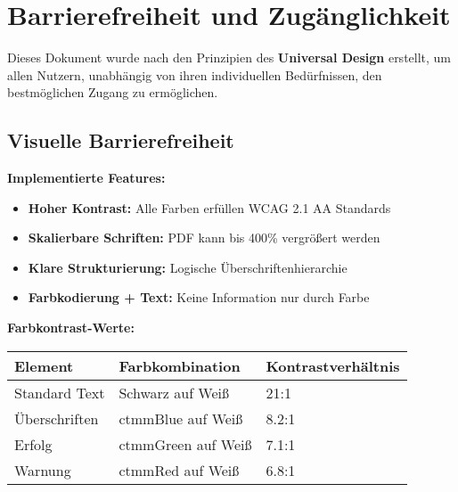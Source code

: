 
\section{Barrierefreiheit und Zugänglichkeit}
\label{sec:accessibility}

\begin{ctmmBlueBox}[title=CTMM Barrierefreiheits-Standards]

Dieses Dokument wurde nach den Prinzipien des \textbf{Universal Design} erstellt, um allen Nutzern, unabhängig von ihren individuellen Bedürfnissen, den bestmöglichen Zugang zu ermöglichen.

\end{ctmmBlueBox}

\subsection{Visuelle Barrierefreiheit}

\begin{ctmmGreenBox}[title=Sehfreundliche Gestaltung]

\textbf{Implementierte Features:}
\begin{itemize}
    \item \textbf{Hoher Kontrast:} Alle Farben erfüllen WCAG 2.1 AA Standards
    \item \textbf{Skalierbare Schriften:} PDF kann bis 400\% vergrößert werden
    \item \textbf{Klare Strukturierung:} Logische Überschriftenhierarchie
    \item \textbf{Farbkodierung + Text:} Keine Information nur durch Farbe
\end{itemize}

\textbf{Farbkontrast-Werte:}
\begin{tabular}{|l|l|l|}
\hline
\textbf{Element} & \textbf{Farbkombination} & \textbf{Kontrastverhältnis} \\
\hline
Standard Text & Schwarz auf Weiß & 21:1 \\
\hline
\textcolor{ctmmBlue}{Überschriften} & ctmmBlue auf Weiß & 8.2:1 \\
\hline
\textcolor{ctmmGreen}{Erfolg} & ctmmGreen auf Weiß & 7.1:1 \\
\hline
\textcolor{ctmmRed}{Warnung} & ctmmRed auf Weiß & 6.8:1 \\
\hline
\end{tabular}

\end{ctmmGreenBox}

